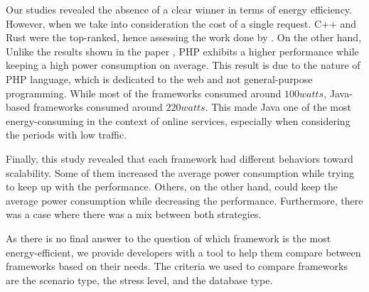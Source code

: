Our studies revealed the absence of a clear winner in terms of energy efficiency.
However, when we take into consideration the cost of a single request.
C++ and Rust were the top-ranked, hence assessing the work done by \citeauthor{pereira_energy_2017}.
On the other hand, Unlike the results shown in the paper \cite{pereira_energy_2017}, \textsf{PHP} exhibits a higher performance while keeping a high power consumption on average.
This result is due to the nature of \textsf{PHP} language, which is dedicated to the web and not general-purpose programming.
While most of the frameworks consumed around $100 watts$, \textsf{Java}-based frameworks consumed around $220 watts$.
This made \textsf{Java} one of the most energy-consuming in the context of online services, especially when considering the periods with low traffic.

Finally, this study revealed that each framework had different behaviors toward scalability.
Some of them increased the average power consumption while trying to keep up with the performance.
Others, on the other hand, could keep the average power consumption while decreasing the performance.
Furthermore, there was a case where there was a mix between both strategies.

As there is no final answer to the question of which framework is the most energy-efficient, we provide developers with a tool to help them compare between frameworks based on their needs.
The criteria we used to compare frameworks are the scenario type, the stress level, and the database type.

